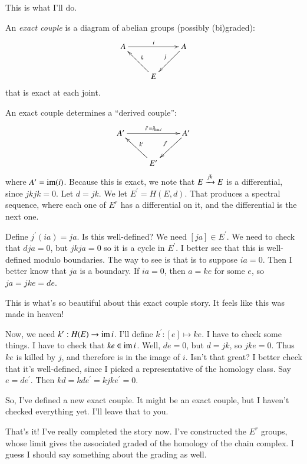 This is what I'll do.
\begin{definition}
    An \emph{exact couple} is a diagram of abelian groups (possibly (bi)graded):
    \begin{equation*}
	\xymatrix{
	    A\ar[rr]^i & & A\ar[dl]_j\\
	    & E\ar[ul]_k & 
	    }
    \end{equation*}
    that is exact at each joint.
\end{definition}
An exact couple determines a ``derived couple'':
\begin{equation*}
    \xymatrix{
	A^\prime\ar[rr]^{i^\prime = i|_{\img i}} & & A^\prime\ar[dl]_{j^\prime}\\
	& E^\prime\ar[ul]_{k^\prime} & 
        }
\end{equation*}
where $A^\prime = \operatorname{im}(i)$.
Because this is exact, we note that $E\xrightarrow{{jk}} E$ is a differential, since $jkjk = 0$.
Let $d = jk$.
We let $E^\prime = H(E,d)$.
That produces a spectral sequence, where each one of $E^r$ has a differential on it, and the differential is the next one.

Define $j^\prime(ia) = ja$.
Is this well-defined? We need $[ja] \in E^\prime$.
We need to check that $dja = 0$, but $jkja = 0$ so it is a cycle in $E^\prime$.
I better see that this is well-defined modulo boundaries.
The way to see is that is to suppose $ia = 0$.
Then I better know that $ja$ is a boundary.
If $ia = 0$, then $a = ke$ for some $e$, so $ja = jke = de$.

This is what's so beautiful about this exact couple story.
It feels like this was made in heaven!

Now, we need $k^\prime:H(E) \to \operatorname{im} i$.
I'll define $k^\prime:[e]\mapsto ke$.
I have to check some things.
I have to check that $ke\in\operatorname{im} i$.
Well, $de = 0$, but $d = jk$, so $jke = 0$.
Thus $ke$ is killed by $j$, and therefore is in the image of $i$.
Isn't that great?
I better check that it's well-defined, since I picked a representative of the homology class.
Say $e = de^\prime$.
Then $kd = kd e^\prime = kjke^\prime = 0$.

So, I've defined a new exact couple.
It might be an exact couple, but I haven't checked everything yet.
I'll leave that to you.

That's it!
I've really completed the story now.
I've constructed the $E^r$ groups, whose limit gives the associated graded of the homology of the chain complex.
I guess I should say something about the grading as well.

